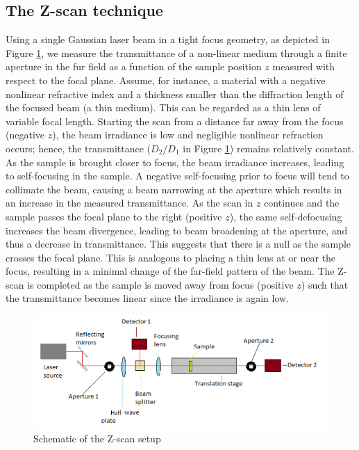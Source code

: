 \documentclass[%
 reprint,
 amsmath,amssymb,
 aps,
]{revtex4-2}
\begin{document}
	\subsection{The Z-scan technique}
		Using a single Gaussian laser beam in a tight focus geometry, as depicted in Figure \ref{fig:schematic}, we measure the transmittance of a non-linear medium through a finite aperture in the fur field as a function of the sample position $ z $ measured with respect to the focal plane. Assume, for instance, a material with a negative nonlinear refractive index and a thickness smaller than the diffraction length of the focused beam (a thin medium). This can be regarded as a thin lens of variable focal length. Starting the scan from a distance far away from the focus (negative $ z $), the beam irradiance is low and negligible nonlinear refraction occurs; hence, the transmittance ($ D_2/D_1 $ in Figure \ref{fig:schematic}) remains relatively constant. As the sample is brought closer to focus, the beam irradiance increases, leading to self-focusing in the sample. A negative self-focusing prior to focus will tend to collimate the beam, causing a beam narrowing at the aperture which results in an increase in the measured transmittance. As the scan in $ z $ continues and the sample passes the focal plane to the right (positive $ z $), the same self-defocusing increases the beam divergence, leading to beam broadening at the aperture, and thus a decrease in transmittance. This suggests that there is a null as the sample crosses the focal plane. This is analogous to placing a thin lens at or near the focus, resulting in a minimal change of the far-field pattern of the beam. The Z-scan is completed as the sample is moved away from focus (positive $ z $) such that the transmittance becomes linear since the irradiance is again low.
		\begin{figure}
			\includegraphics[scale = 1]{schematic}
			\caption{Schematic of the Z-scan setup}
			\label{fig:schematic}
		\end{figure}
		\par 
\end{document}
